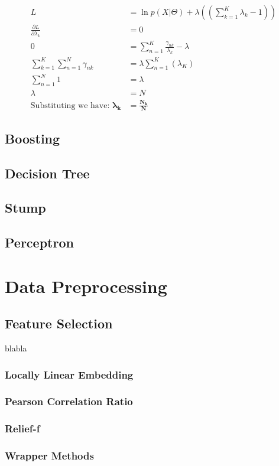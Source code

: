 \documentclass[11pt]{article}
\begin{document}
\begin{align*}
L &=\ln p(X|\Theta) + \lambda((\sum_{k=1}^K \lambda_k-1)) \\
\frac{\partial L}{\partial \lambda_k} &= 0 \\
0 &= \sum_{n=1}^K \frac{\gamma_{nk}}{\lambda_k} - \lambda \\
\sum_{k=1}^K \sum_{n=1}^N \gamma_{nk} &= \lambda \sum_{n=1}^K( \lambda_K) \\
\sum_{n=1}^N 1 &= \lambda \\
\lambda &= N\\
\text{Substituting we have:~} \bm{\lambda_k} &= \bm{\frac{N_k}{N}}
\end{align*}
\subsection{Boosting}
\subsection{Decision Tree}
\subsection{Stump}
\subsection{Perceptron}

\section{Data Preprocessing}
\subsection{Feature Selection}
blabla
\subsubsection{Locally Linear Embedding}
\subsubsection{Pearson Correlation Ratio}
\subsubsection{Relief-f}
\subsubsection{Wrapper Methods}
\end{document}
